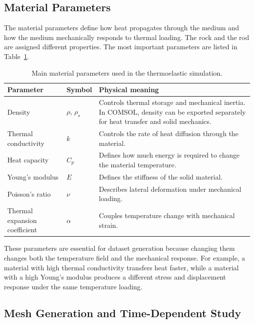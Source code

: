 \subsection{Material Parameters}

The material parameters define how heat propagates through the medium and how the medium mechanically responds to thermal loading. The rock and the rod are assigned different properties. The most important parameters are listed in Table~\ref{tab:comsol_material_parameters}.

\begin{table}[H]
\centering
\caption{Main material parameters used in the thermoelastic simulation.}
\label{tab:comsol_material_parameters}
\begin{tabular}{p{} p{} p{}}
\hline
\textbf{Parameter} & \textbf{Symbol} & \textbf{Physical meaning} \\
\hline
Density & \(\rho\), \(\rho_s\) & Controls thermal storage and mechanical inertia. In COMSOL, density can be exported separately for heat transfer and solid mechanics. \\
\hline
Thermal conductivity & \(k\) & Controls the rate of heat diffusion through the material. \\
\hline
Heat capacity & \(C_p\) & Defines how much energy is required to change the material temperature. \\
\hline
Young's modulus & \(E\) & Defines the stiffness of the solid material. \\
\hline
Poisson's ratio & \(\nu\) & Describes lateral deformation under mechanical loading. \\
\hline
Thermal expansion coefficient & \(\alpha\) & Couples temperature change with mechanical strain. \\
\hline
\end{tabular}
\end{table}

These parameters are essential for dataset generation because changing them changes both the temperature field and the mechanical response. For example, a material with high thermal conductivity transfers heat faster, while a material with a high Young's modulus produces a different stress and displacement response under the same temperature loading.

\subsection{Mesh Generation and Time-Dependent Study}

